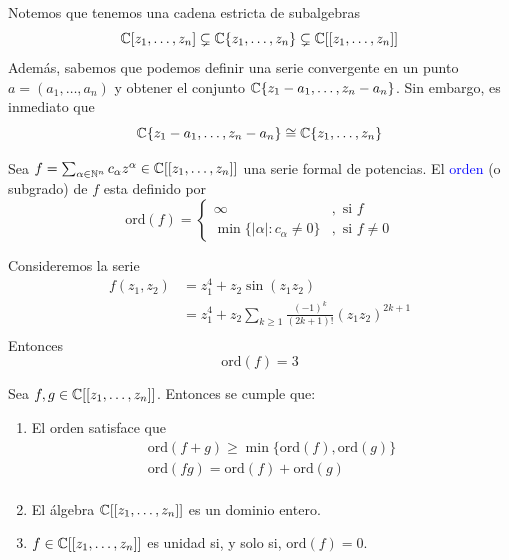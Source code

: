 \begin{remark}
    Notemos que tenemos una cadena estricta de subalgebras
    \begin{equation*}
        \mathbb{C}[z_1,\dots,z_n]\subsetneq\mathbb{C}\{z_1,\dots,z_n\}\subsetneq\mathbb{C}[[z_1,\dots,z_n]]
    \end{equation*}
    Además, sabemos que podemos definir una serie convergente en un punto $a=(a_1,\dots,a_n)$ y obtener el conjunto $\mathbb{C}\{z_1-a_1,\dots,z_n-a_n\}$. Sin embargo, es inmediato que
    \begin{equation*}
        \mathbb{C}\{z_1-a_1,\dots,z_n-a_n\}\cong 
        \mathbb{C}\{z_1,\dots,z_n\}
    \end{equation*}
\end{remark}

\begin{definition}
    Sea $f=\sum_{\alpha\in\mathbb{N}^n}c_\alpha z^{\alpha}\in\mathbb{C}[[z_1,\dots,z_n]]$ una serie formal de potencias. El \textcolor{blue}{orden} (o subgrado) de $f$ esta definido por
    \begin{equation*}
        \mathrm{ord}(f)=\begin{cases}
            \infty &,\text{ si }f\\
            \min\{|\alpha|:c_\alpha\neq 0\} &,\text{ si }f\neq 0
        \end{cases}
    \end{equation*}
\end{definition}

\begin{example}
    Consideremos la serie
    \begin{align*}
        f(z_1,z_2)&=z_1^4+z_2\sin(z_1z_2)\\
        &=z_1^4+z_2\sum_{k\geq 1}\frac{(-1)^k}{(2k+1)!}(z_1z_2)^{2k+1} \\
    \end{align*}
    Entonces
    \begin{equation*}
        \mathrm{ord}(f)=3
    \end{equation*}
\end{example}

\begin{lemma}
    Sea $f,g\in \mathbb{C}[[z_1,\dots,z_n]]$. Entonces se cumple que:
    \begin{enumerate}
        \item El orden satisface que
        \begin{align*}
            \mathrm{ord}(f+g)\geq \min\{\mathrm{ord}(f),\mathrm{ord}(g)\}\\
            \mathrm{ord}(fg)=\mathrm{ord}(f)+\mathrm{ord}(g)\\
        \end{align*}
        \item El álgebra $\mathbb{C}[[z_1,\dots,z_n]]$ es un dominio entero.
        \item $f\in  \mathbb{C}[[z_1,\dots,z_n]]$ es unidad si, y solo si, $\mathrm{ord}(f)=0$.
    \end{enumerate}
\end{lemma}

